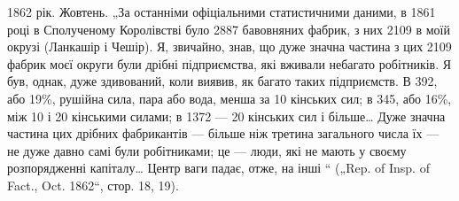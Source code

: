 1862 рік. Жовтень. „За останніми офіціальними статистичними
даними, в 1861 році в Сполученому Королівстві було 2887 бавовняних
фабрик, з них 2109 в моїй окрузі (Ланкашір і Чешір). Я, звичайно,
знав, що дуже значна частина з цих 2109 фабрик моєї округи
були дрібні підприємства, які вживали небагато робітників. Я
був, однак, дуже здивований, коли виявив, як багато таких підприємств.
В 392, або 19\%, рушійна сила, пара або вода, менша за
10 кінських сил; в 345, або 16\%, між 10 і 20 кінськими силами;
в 1372 — 20 кінських сил і більше\dots{} Дуже значна частина цих
дрібних фабрикантів — більше ніж третина загального числа їх —
не дуже давно самі були робітниками; це — люди, які не мають
у своєму розпорядженні капіталу\dots{} Центр ваги падає, отже, на
інші “ („Rep. of Insp. of Fact., Oct. 1862“, стор. 18, 19).
